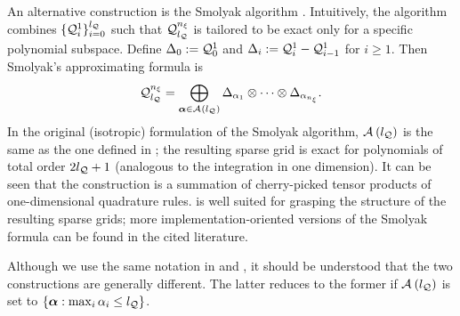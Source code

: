 An alternative construction is the Smolyak algorithm \cite{maitre2010, eldred2008}.
Intuitively, the algorithm combines $\{ \quadrature{1}{i} \}_{i = 0}^\nqlevel$ such that $\quadrature$ is tailored to be exact only for a specific polynomial subspace.
Define $\Delta_0 := \quadrature{1}{0}$ and $\Delta_i := \quadrature{1}{i} - \quadrature{1}{i - 1}$ for $i \geq 1$.
Then Smolyak's approximating formula is
\begin{equation} \xelab{smolyak-sparse-grid}
  \quadrature = \bigoplus_{\multiindex \in \quadratureMultiindexSet{\nqlevel}} \Delta_{\alpha_1} \otimes \cdots \otimes \Delta_{\alpha_\nvars}.
\end{equation}
In the original (isotropic) formulation of the Smolyak algorithm, $\mathcal{A}_{}\left( {l_\mathcal{Q}} \right)$ is the same as the one defined in ; the resulting sparse grid is exact for polynomials of total order $2 {l_\mathcal{Q}} + 1$ (analogous to the integration in one dimension).
It can be seen that the construction is a summation of cherry-picked tensor products of one-dimensional quadrature rules.
 is well suited for grasping the structure of the resulting sparse grids; more implementation-oriented versions of the Smolyak formula can be found in the cited literature.
\begin{remark}
Although we use the same notation in  and , it should be understood that the two constructions are generally different.
The latter reduces to the former if $\mathcal{A}_{}\left( {l_\mathcal{Q}} \right)$ is set to $\{ \bm{\alpha}: \max_i \alpha_i \leq {l_\mathcal{Q}} \}$.
\end{remark}
